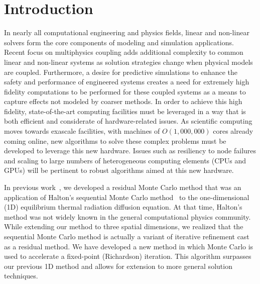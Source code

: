 \documentclass[preprint,12pt]{elsarticle}
\begin{document}
\section{Introduction}
\label{sec:introduction}

In nearly all computational engineering and physics fields, linear and
non-linear solvers form the core components of modeling and simulation
applications. Recent focus on multiphysics coupling adds additional complexity
to common linear and non-linear systems as solution strategies change when
physical models are coupled. Furthermore, a desire for predictive simulations
to enhance the safety and performance of engineered systems creates a need for
extremely high fidelity computations to be performed for these coupled systems
as a means to capture effects not modeled by coarser methods. In order to
achieve this high fidelity, state-of-the-art computing facilities must be
leveraged in a way that is both efficient and considerate of hardware-related
issues. As scientific computing moves towards exascale facilities, with
machines of $O(1,000,000)$ cores already coming online, new algorithms to
solve these complex problems must be developed to leverage this new
hardware. Issues such as resiliency to node failures and scaling to large
numbers of heterogeneous computing elements (CPUs and GPUs) will be pertinent
to robust algorithms aimed at this new hardware.

In previous work~\cite{evans_2003}, we developed a residual Monte Carlo method
that was an application of Halton's sequential Monte Carlo
method~\cite{halton_1962,halton_1994} to the one-dimensional (1D) equilibrium
thermal radiation diffusion equation.  At that time, Halton's method was not
widely known in the general computational physics community.  While extending
our method to three spatial dimensions, we realized that the sequential Monte
Carlo method is actually a variant of iterative refinement cast as a residual
method. We have developed a new method in which Monte Carlo is used to
accelerate a fixed-point (Richardson) iteration. This algorithm surpasses our
previous 1D method and allows for extension to more general solution
techniques.
\end{document}
